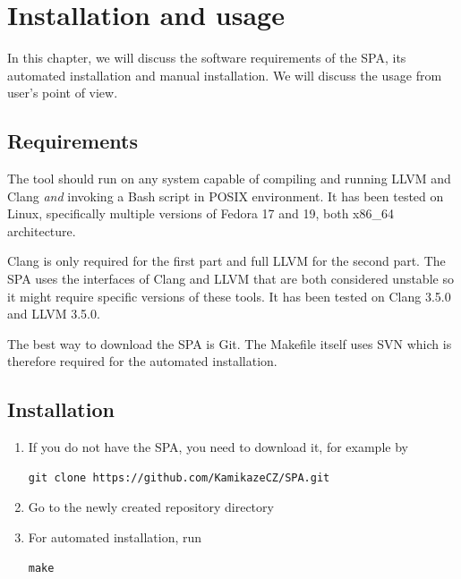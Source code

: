 \chapter{Installation and usage}
In this chapter, we will discuss the software requirements of the SPA, its automated installation and manual installation. We will discuss the usage from user's point of view.%
\section{Requirements}
The tool should run on any system capable of compiling and running LLVM and Clang \emph{and} invoking a Bash script in POSIX environment. It has been tested on Linux, specifically multiple versions of Fedora 17 and 19, both x86\_64 architecture.

Clang is only required for the first part and full LLVM for the second part. The SPA uses the interfaces of Clang and LLVM that are both considered unstable so it might require specific versions of these tools. It has been tested on Clang 3.5.0  and LLVM 3.5.0.

The best way to download the SPA is Git. The Makefile itself uses SVN which is therefore required for the automated installation.
\section{Installation}
\begin{enumerate}
\item If you do not have the SPA, you need to download it, for example by
\begin{verbatim}git clone https://github.com/KamikazeCZ/SPA.git\end{verbatim}

\item Go to the newly created repository directory

\item For automated installation, run
\begin{verbatim}make\end{verbatim}
\end{enumerate}
